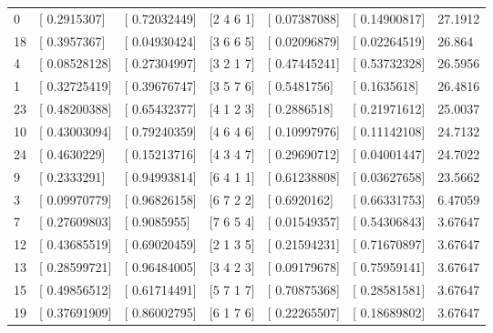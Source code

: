 \begin{table}[h]
\begin{tabular}{@{}lllllll@{}}
    0                & {[} 0.2915307{]}  & {[} 0.72032449{]} & {[}2 4 6 1{]}   & {[} 0.07387088{]}      & {[} 0.14900817{]}    & 27.1912         \\
    18               & {[} 0.3957367{]}  & {[} 0.04930424{]} & {[}3 6 6 5{]}   & {[} 0.02096879{]}      & {[} 0.02264519{]}    & 26.864          \\
    4                & {[} 0.08528128{]} & {[} 0.27304997{]} & {[}3 2 1 7{]}   & {[} 0.47445241{]}      & {[} 0.53732328{]}    & 26.5956         \\
    1                & {[} 0.32725419{]} & {[} 0.39676747{]} & {[}3 5 7 6{]}   & {[} 0.5481756{]}       & {[} 0.1635618{]}     & 26.4816         \\
    23               & {[} 0.48200388{]} & {[} 0.65432377{]} & {[}4 1 2 3{]}   & {[} 0.2886518{]}       & {[} 0.21971612{]}    & 25.0037         \\
    10               & {[} 0.43003094{]} & {[} 0.79240359{]} & {[}4 6 4 6{]}   & {[} 0.10997976{]}      & {[} 0.11142108{]}    & 24.7132         \\
    24               & {[} 0.4630229{]}  & {[} 0.15213716{]} & {[}4 3 4 7{]}   & {[} 0.29690712{]}      & {[} 0.04001447{]}    & 24.7022         \\
    9                & {[} 0.2333291{]}  & {[} 0.94993814{]} & {[}6 4 1 1{]}   & {[} 0.61238808{]}      & {[} 0.03627658{]}    & 23.5662         \\
    3                & {[} 0.09970779{]} & {[} 0.96826158{]} & {[}6 7 2 2{]}   & {[} 0.6920162{]}       & {[} 0.66331753{]}    & 6.47059         \\
    7                & {[} 0.27609803{]} & {[} 0.9085955{]}  & {[}7 6 5 4{]}   & {[} 0.01549357{]}      & {[} 0.54306843{]}    & 3.67647         \\
    12               & {[} 0.43685519{]} & {[} 0.69020459{]} & {[}2 1 3 5{]}   & {[} 0.21594231{]}      & {[} 0.71670897{]}    & 3.67647         \\
    13               & {[} 0.28599721{]} & {[} 0.96484005{]} & {[}3 4 2 3{]}   & {[} 0.09179678{]}      & {[} 0.75959141{]}    & 3.67647         \\
    15               & {[} 0.49856512{]} & {[} 0.61714491{]} & {[}5 7 1 7{]}   & {[} 0.70875368{]}      & {[} 0.28581581{]}    & 3.67647         \\
    19               & {[} 0.37691909{]} & {[} 0.86002795{]} & {[}6 1 7 6{]}   & {[} 0.22265507{]}      & {[} 0.18689802{]}    & 3.67647         \\ \bottomrule
    \end{tabular}
\end{table}

